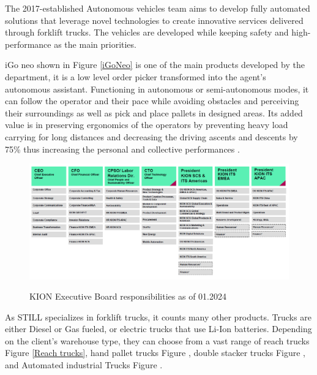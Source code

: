 The 2017-established Autonomous vehicles team aims to develop fully automated solutions that leverage 
novel technologies to create innovative services delivered through forklift trucks. 
The vehicles are developed while keeping safety and high-performance as the main priorities.  

iGo neo shown in Figure \ref{iGoNeo} is one of the main products developed by the department, it is a low level order picker transformed 
into the agent's autonomous assistant. Functioning in autonomous or semi-autonomous modes, it can follow 
the operator and their pace while avoiding obstacles and perceiving their surroundings as well as pick 
and place pallets in designed areas. Its added value is in preserving ergonomics of the operators by 
preventing heavy load carrying for long distances and decreasing the driving ascents and descents by 75\% 
thus increasing the personal and collective performances \cite{R3}.

\begin{figure}[H]
    \begin{center}
    \includegraphics[width=7in]{images/Chap0/KION_Hierarchy.png}\\
    \caption{KION Executive Board responsibilities as of 01.2024 \cite{R2}}
    \label{KION Hierarchy}
    \end{center}
    \end{figure}

As STILL specializes in forklift trucks, it counts many other products. Trucks are either Diesel or 
Gas fueled, or electric trucks that use Li-Ion batteries. Depending on the client's warehouse type, they can
choose from a vast range of reach trucks Figure \ref{Reach trucks}, hand pallet trucks Figure , 
double stacker trucks Figure , and Automated industrial Trucks Figure  \cite{R4}.


